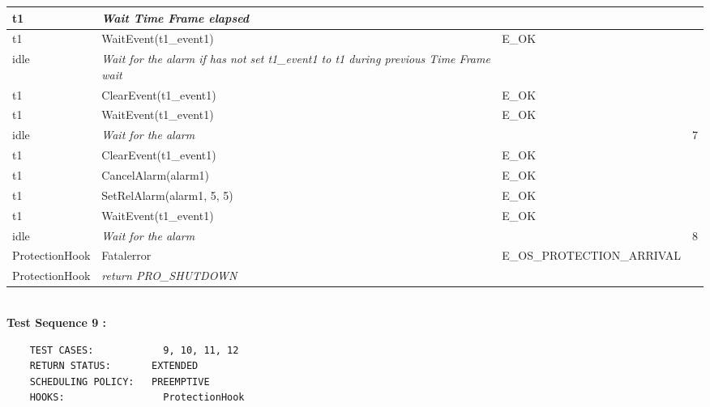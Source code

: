 \documentclass[10pt]{article}
\newlength{\Li}\settowidth{\Li}{Running}
\newlength{\Lii}\setlength{\Lii}{7cm}
\newlength{\Liiii}\setlength{\Liiii}{0.9cm}
\newlength{\Liii}\setlength{\Liii}{\textwidth} \addtolength{\Liii}{-\Li} \addtolength{\Liii}{-\Lii} \addtolength{\Liii}{-\Liiii}
\begin{document}
	\begin{supertabular}{|p{\Li}|p{\Lii}|p{\Liii}|p{\Liiii}|} \hline 
	t1	& \textit{Wait Time Frame elapsed}						& 										& \\ \hline
	t1	& WaitEvent(t1\_event1)								& E\_OK									& \\ \hline
	idle	& \textit{Wait for the alarm if has not set t1\_event1 to t1 during previous Time Frame wait}	&				& \\ \hline
	t1	& ClearEvent(t1\_event1)								& E\_OK									&  \\ \hline
	t1	& WaitEvent(t1\_event1)								& E\_OK									& \\ \hline
	idle	& \textit{Wait for the alarm}							& 										& 7 \\ \hline
	t1	& ClearEvent(t1\_event1)								& E\_OK									&  \\ \hline
	t1	& CancelAlarm(alarm1)								& E\_OK									& \\ \hline
	t1	& SetRelAlarm(alarm1, 5, 5)							& E\_OK									& \\ \hline
	t1	& WaitEvent(t1\_event1)								& E\_OK									& \\ \hline
	idle	& \textit{Wait for the alarm}							& 										& 8 \\ \hline
	ProtectionHook		& Fatalerror					& E\_OS\_PROTECTION\_ARRIVAL						& \\ \hline
	ProtectionHook		& \textit{return PRO\_SHUTDOWN}			& 										& \\ \hline
	\end{supertabular}\\	
	
	\textbf{Test Sequence 9 :}
	\begin{lstlisting}
	TEST CASES:		       9, 10, 11, 12
	RETURN STATUS:	  	 EXTENDED
	SCHEDULING POLICY:   PREEMPTIVE
	HOOKS:		           ProtectionHook
	\end{lstlisting}
	
\end{document}
